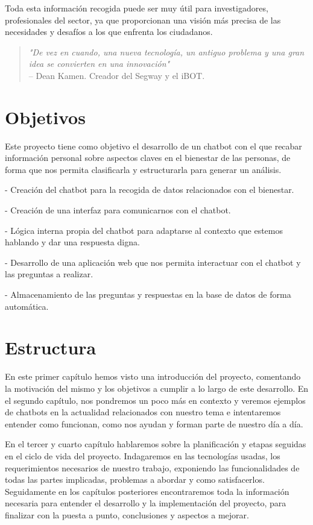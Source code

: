 Toda esta información recogida puede ser muy útil para investigadores, profesionales del sector, ya que proporcionan una visión más precisa de las necesidades y desafíos a los que enfrenta los ciudadanos. 


\begin{quote}
    \textit{"De vez en cuando, una nueva tecnología, un antiguo problema y una gran idea se convierten en una innovación"} \\ 
    -- Dean Kamen. Creador del Segway y el iBOT.
\end{quote}

\section{Objetivos}

Este proyecto tiene como objetivo el desarrollo de un chatbot con el que recabar información personal sobre aspectos claves en el bienestar de las personas, de forma que nos permita clasificarla y estructurarla para generar un análisis. 

- Creación del chatbot para la recogida de datos relacionados con el bienestar.\vspace{0.1cm}

- Creación de una interfaz para comunicarnos con el chatbot. \vspace{0.1cm}

- Lógica interna propia del chatbot para adaptarse al contexto que estemos hablando y dar una respuesta digna. \vspace{0.1cm}

- Desarrollo de una aplicación web que nos permita interactuar con el chatbot y las preguntas a realizar.\vspace{0.1cm}

- Almacenamiento de las preguntas y respuestas en la base de datos de forma automática.
\vspace{0.3cm}

\section{Estructura}

En este primer capítulo hemos visto una introducción del proyecto, comentando la motivación del mismo y los objetivos a cumplir a lo largo de este desarrollo. En el segundo capítulo, nos pondremos un poco más en contexto y veremos ejemplos de chatbots en la actualidad relacionados con nuestro tema e intentaremos entender como funcionan, como nos ayudan y forman parte de nuestro día a día.

En el tercer y cuarto capítulo hablaremos sobre la planificación y etapas seguidas en el ciclo de vida del proyecto. Indagaremos en las tecnologías usadas, los requerimientos necesarios de nuestro trabajo, exponiendo las funcionalidades de todas las partes implicadas, problemas a abordar y como satisfacerlos. Seguidamente en los capítulos posteriores encontraremos toda la información necesaria para entender el desarrollo y la implementación del proyecto, para finalizar con la puesta a punto, conclusiones y aspectos a mejorar. 